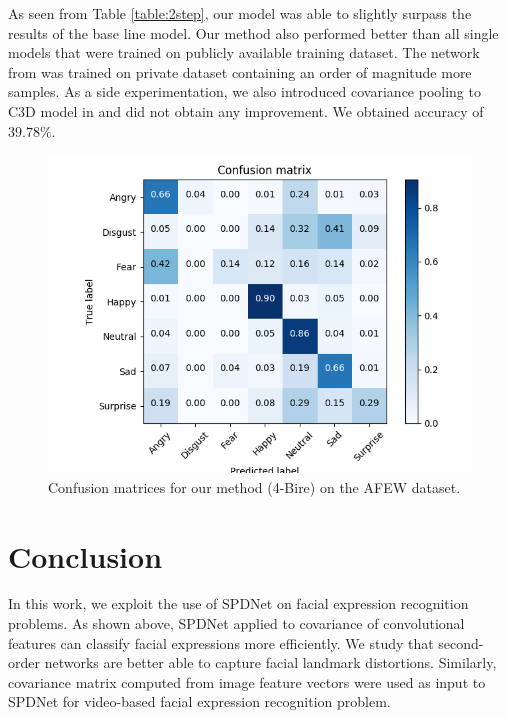 \documentclass[10pt,twocolumn,letterpaper]{article}
\begin{document}
		As seen from Table \ref{table:2step}, our model was able to slightly surpass the results of the base line model. Our method also performed better than all single models that were trained on publicly available training dataset. The network from \cite{emoti167} was trained on private dataset containing an order of magnitude more samples. As a side experimentation, we also introduced covariance pooling to C3D model in \cite{emoti161} and did not obtain any improvement. We obtained accuracy of $39.78\%$.
		

		\begin{figure}
			    \begin{center}
			    \includegraphics[width=.95\linewidth,keepaspectratio]{res/cm_sfew}	
			    \end{center}
			\caption{Confusion matrices for our method (4-Bire) on the AFEW dataset.}
			\label{fig:cmTemporal}
		\end{figure}
		
		\section{Conclusion}
		
		
		In this work, we exploit the use of SPDNet on facial expression recognition problems. As shown above, SPDNet applied to covariance of convolutional features can classify facial expressions more efficiently. We study that second-order networks are better able to capture facial landmark distortions. Similarly, covariance matrix computed from image feature vectors were used as input to SPDNet for video-based facial expression recognition problem.
		
\end{document}
